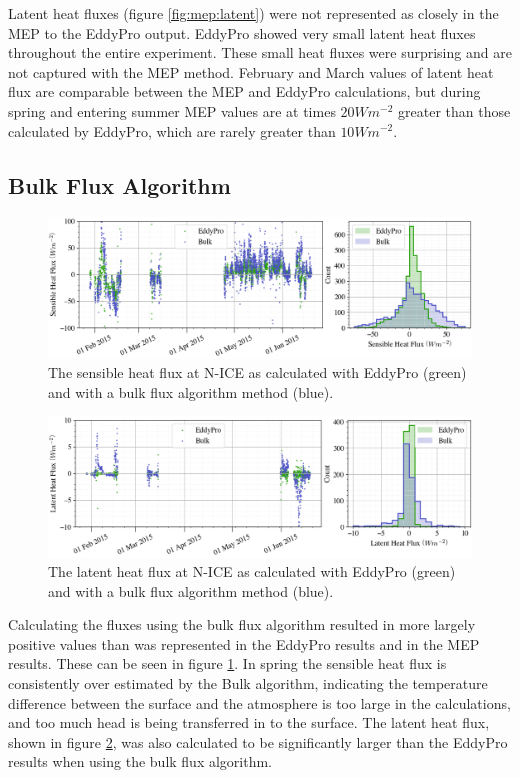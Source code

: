 Latent heat fluxes (figure \ref{fig:mep:latent}) were not represented as closely in the MEP to the EddyPro output. EddyPro showed very small latent heat fluxes throughout the entire experiment. These small heat fluxes were surprising and are not captured with the MEP method. February and March values of latent heat flux are comparable between the MEP and EddyPro calculations, but during spring and entering summer MEP values are at times $20 Wm^{-2}$ greater than those calculated by EddyPro, which are rarely greater than $10 Wm^{-2}$.

 \subsection{Bulk Flux Algorithm}
\begin{figure}[H]
    \centering
    \includegraphics[width=1\linewidth]{figures/chapter3/BulkSensible.png}
    \caption[Sensible heat flux from a bulk flux method compared to EddyPro]{The sensible heat flux at N-ICE as calculated with EddyPro (green) and with a bulk flux algorithm method (blue).}
    \label{fig:bulk:sensible}
\end{figure}
\begin{figure}[H]
    \centering
    \includegraphics[width=1\linewidth]{figures/chapter3/BulkLatent.png}
    \caption[Latent heat flux from a bulk flux method compared to EddyPro]{The latent heat flux at N-ICE as calculated with EddyPro (green) and with a bulk flux algorithm method (blue).}
    \label{fig:bulk:latent}
\end{figure}

Calculating the fluxes using the bulk flux algorithm resulted in more largely positive values than was represented in the EddyPro results and in the MEP results. These can be seen in figure \ref{fig:bulk:sensible}. In spring the sensible heat flux is consistently over estimated by the Bulk algorithm, indicating the temperature difference between the surface and the atmosphere is too large in the calculations, and too much head is being transferred in to the surface. The latent heat flux, shown in figure \ref{fig:bulk:latent}, was also calculated to be significantly larger than the EddyPro results when using the bulk flux algorithm. 

